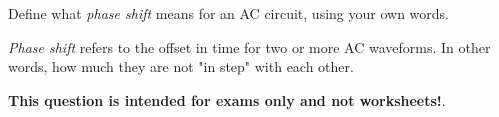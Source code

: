 

Define what {\it phase shift} means for an AC circuit, using your own words.







{\it Phase shift} refers to the offset in time for two or more AC waveforms.  In other words, how much they are not "in step" with each other.







{\bf This question is intended for exams only and not worksheets!}.



